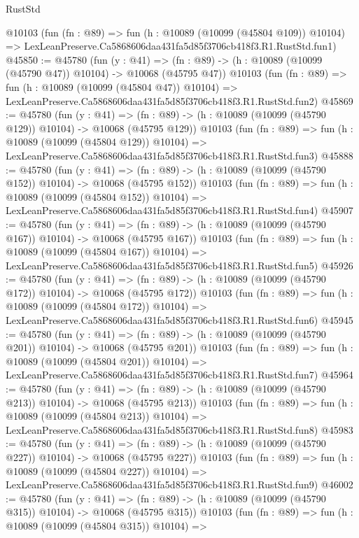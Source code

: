 \begin{lexlean}{RustStd}
\begin{coremodule}
    @10103
    (fun (fn : @89) =>
    fun (h : @10089 (@10099 (@45804 @109)) @10104) =>
    LexLeanPreserve.Ca5868606daa431fa5d85f3706cb418f3.R1.RustStd.fun1)
@45850 := @45780
    (fun (y : @41) =>
    (fn : @89) -> (h : @10089 (@10099 (@45790 @47)) @10104) -> @10068 (@45795 @47))
    @10103
    (fun (fn : @89) =>
    fun (h : @10089 (@10099 (@45804 @47)) @10104) =>
    LexLeanPreserve.Ca5868606daa431fa5d85f3706cb418f3.R1.RustStd.fun2)
@45869 := @45780
    (fun (y : @41) =>
    (fn : @89) -> (h : @10089 (@10099 (@45790 @129)) @10104) -> @10068 (@45795 @129))
    @10103
    (fun (fn : @89) =>
    fun (h : @10089 (@10099 (@45804 @129)) @10104) =>
    LexLeanPreserve.Ca5868606daa431fa5d85f3706cb418f3.R1.RustStd.fun3)
@45888 := @45780
    (fun (y : @41) =>
    (fn : @89) -> (h : @10089 (@10099 (@45790 @152)) @10104) -> @10068 (@45795 @152))
    @10103
    (fun (fn : @89) =>
    fun (h : @10089 (@10099 (@45804 @152)) @10104) =>
    LexLeanPreserve.Ca5868606daa431fa5d85f3706cb418f3.R1.RustStd.fun4)
@45907 := @45780
    (fun (y : @41) =>
    (fn : @89) -> (h : @10089 (@10099 (@45790 @167)) @10104) -> @10068 (@45795 @167))
    @10103
    (fun (fn : @89) =>
    fun (h : @10089 (@10099 (@45804 @167)) @10104) =>
    LexLeanPreserve.Ca5868606daa431fa5d85f3706cb418f3.R1.RustStd.fun5)
@45926 := @45780
    (fun (y : @41) =>
    (fn : @89) -> (h : @10089 (@10099 (@45790 @172)) @10104) -> @10068 (@45795 @172))
    @10103
    (fun (fn : @89) =>
    fun (h : @10089 (@10099 (@45804 @172)) @10104) =>
    LexLeanPreserve.Ca5868606daa431fa5d85f3706cb418f3.R1.RustStd.fun6)
@45945 := @45780
    (fun (y : @41) =>
    (fn : @89) -> (h : @10089 (@10099 (@45790 @201)) @10104) -> @10068 (@45795 @201))
    @10103
    (fun (fn : @89) =>
    fun (h : @10089 (@10099 (@45804 @201)) @10104) =>
    LexLeanPreserve.Ca5868606daa431fa5d85f3706cb418f3.R1.RustStd.fun7)
@45964 := @45780
    (fun (y : @41) =>
    (fn : @89) -> (h : @10089 (@10099 (@45790 @213)) @10104) -> @10068 (@45795 @213))
    @10103
    (fun (fn : @89) =>
    fun (h : @10089 (@10099 (@45804 @213)) @10104) =>
    LexLeanPreserve.Ca5868606daa431fa5d85f3706cb418f3.R1.RustStd.fun8)
@45983 := @45780
    (fun (y : @41) =>
    (fn : @89) -> (h : @10089 (@10099 (@45790 @227)) @10104) -> @10068 (@45795 @227))
    @10103
    (fun (fn : @89) =>
    fun (h : @10089 (@10099 (@45804 @227)) @10104) =>
    LexLeanPreserve.Ca5868606daa431fa5d85f3706cb418f3.R1.RustStd.fun9)
@46002 := @45780
    (fun (y : @41) =>
    (fn : @89) -> (h : @10089 (@10099 (@45790 @315)) @10104) -> @10068 (@45795 @315))
    @10103
    (fun (fn : @89) =>
    fun (h : @10089 (@10099 (@45804 @315)) @10104) =>

\end{coremodule}
\end{lexlean}
